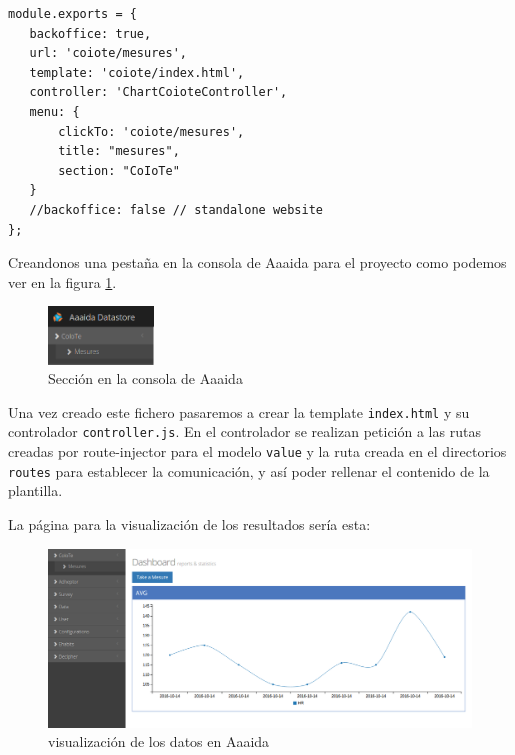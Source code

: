 \begin{verbatim}
module.exports = {
   backoffice: true,
   url: 'coiote/mesures',
   template: 'coiote/index.html',
   controller: 'ChartCoioteController',
   menu: {
       clickTo: 'coiote/mesures',
       title: "mesures",
       section: "CoIoTe"
   }
   //backoffice: false // standalone website
};
\end{verbatim}

Creandonos una pestaña en la consola de Aaaida para el proyecto como podemos ver en la figura \ref{sec:coioteSec}. 

\begin{figure}[htb]
\begin{center}
\includegraphics[width=0.25\textwidth]{./setup/arquitecturaCoiote}
\caption{Sección en la consola de Aaaida}
\label{sec:coioteSec}
\end{center}
\end{figure}

Una vez creado este fichero pasaremos a crear la template \texttt{index.html} y su controlador \texttt{controller.js}. En el controlador se realizan petición a las rutas creadas por route-injector para el modelo \texttt{value} y la ruta creada en el directorios \texttt{routes} para establecer la comunicación, y así poder rellenar el contenido de la plantilla.

La página para la visualización de los resultados sería esta:

\begin{figure}[htb]
\begin{center}
\includegraphics[width=1\textwidth]{./setup/visualizacionPaginaCoiote}
\caption{visualización de los datos en Aaaida}
\end{center}
\end{figure}
\pagebreak

